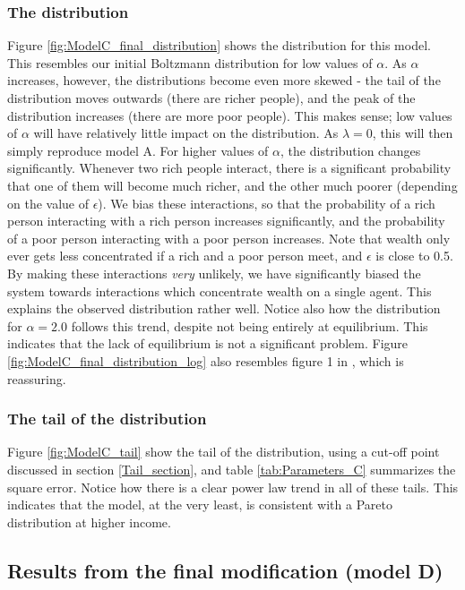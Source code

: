 \documentclass[a4paper, 10pt]{article}
\begin{document}
\subsubsection{The distribution}
Figure \ref{fig:ModelC_final_distribution} shows the distribution for this model. This resembles our initial Boltzmann distribution for low values of $\alpha$. As $\alpha$ increases, however, the distributions become even more skewed - the tail of the distribution moves outwards (there are richer people), and the peak of the distribution increases (there are more poor people). This makes sense; low values of $\alpha$ will have relatively little impact on the distribution. As $\lambda=0$, this will then simply reproduce model A. For higher values of $\alpha$, the distribution changes significantly. Whenever two rich people interact, there is a significant probability that one of them will become much richer, and the other much poorer (depending on the value of $\epsilon$). We bias these interactions, so that the probability of a rich person interacting with a rich person increases significantly, and the probability of a poor person interacting with a poor person increases. Note that wealth only ever gets less concentrated if a rich and a poor person meet, and $\epsilon$ is close to 0.5. By making these interactions \textit{very} unlikely, we have significantly biased the system towards interactions which concentrate wealth on a single agent. This explains the observed distribution rather well. Notice also how the distribution for $\alpha=2.0$ follows this trend, despite not being entirely at equilibrium. This indicates that the lack of equilibrium is not a significant problem. Figure \ref{fig:ModelC_final_distribution_log} also resembles figure 1 in \cite{AgentBased}, which is reassuring.
\subsubsection{The tail of the distribution}
Figure \ref{fig:ModelC_tail} show the tail of the distribution, using a cut-off point discussed in section \ref{Tail_section}, and table \ref{tab:Parameters_C} summarizes the square error. Notice how there is a clear power law trend in all of these tails. This indicates that the model, at the very least, is consistent with a Pareto distribution at higher income.
\newpage
\subsection{Results from the final modification (model D)}
\end{document}

